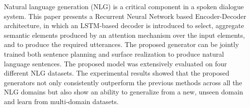 Natural language generation (NLG) is a critical component in a spoken dialogue system. This paper presents a Recurrent Neural Network based Encoder-Decoder architecture, in which an LSTM-based decoder is introduced to select, aggregate semantic elements produced by an attention mechanism over the input elements, and to produce the required utterances. The proposed generator can be jointly trained both sentence planning and surface realization to produce natural language sentences. The proposed model was extensively evaluated on four different NLG datasets. The experimental results showed that the proposed generators not only consistently outperform the previous methods across all the NLG domains but also show an ability to generalize from a new, unseen domain and learn from multi-domain datasets.
